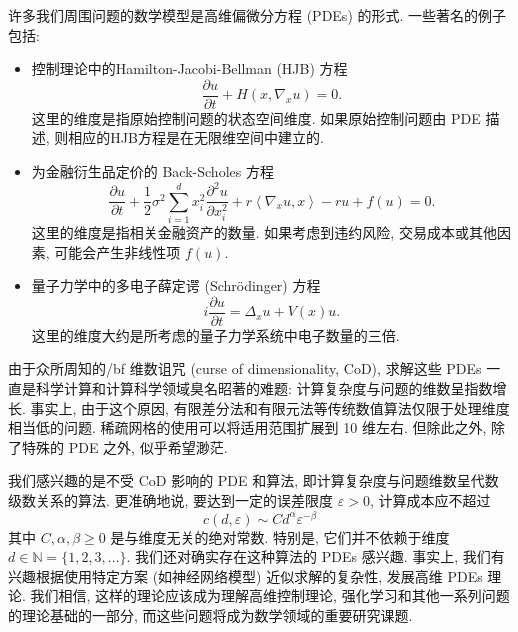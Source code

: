 \documentclass[12pt,AutoFakeBold,AutoFakeSlant]{article}
\newcommand{\bi}{\begin{itemize}}
\newcommand{\ei}{\end{itemize}}
\theoremstyle{definition}
\newcommand{\N}{\mathbb{N}}
\newcommand{\bx}{{x}}
\newcommand{\eps}{\varepsilon}
\begin{document}
	许多我们周围问题的数学模型是高维偏微分方程 (PDEs) 的形式. 一些著名的例子包括:
	\bi
		\item
			控制理论中的Hamilton-Jacobi-Bellman (HJB) 方程
			\begin{equation}
				\frac{ \partial u }{ \partial t } + H( \bx, \nabla_x u ) = 0 .
			\end{equation}
			这里的维度是指原始控制问题的状态空间维度. 如果原始控制问题由 PDE 描述, 则相应的HJB方程是在无限维空间中建立的.
		\item
			为金融衍生品定价的 Back-Scholes 方程
			\begin{equation}
				\frac{ \partial u }{ \partial t } + \frac12\sigma^2 \sum_{i=1}^d x_i^2\frac{\partial^2 u}{\partial x_i^2} + r \left< \nabla_x u , \bx \right> - r u + f(u) = 0 .
			\end{equation}
				这里的维度是指相关金融资产的数量. 如果考虑到违约风险, 交易成本或其他因素, 可能会产生非线性项 $f(u)$.
		\item
			量子力学中的多电子薛定谔 (Schr\"odinger) 方程
			\begin{equation}
				i \frac{ \partial u }{ \partial t } =   \Delta_x u + V(\bx) u .
			\end{equation}
			这里的维度大约是所考虑的量子力学系统中电子数量的三倍.
	\ei

	由于众所周知的{/bf 维数诅咒 (curse of dimensionality, CoD)}, 求解这些 PDEs 一直是科学计算和计算科学领域臭名昭著的难题: 计算复杂度与问题的维数呈指数增长. 事实上, 由于这个原因, 有限差分法和有限元法等传统数值算法仅限于处理维度相当低的问题. 稀疏网格的使用可以将适用范围扩展到 10 维左右. 但除此之外, 除了特殊的 PDE 之外, 似乎希望渺茫.

	我们感兴趣的是不受 CoD 影响的 PDE 和算法, 即计算复杂度与问题维数呈代数级数关系的算法. 更准确地说, 要达到一定的误差限度 $ \eps > 0 $, 计算成本应不超过
	\begin{equation}
		c(d, \eps) \sim C d^{\alpha} \eps^{-\beta}
		\label{cost}
	\end{equation}
	其中 $ C, \alpha, \beta \geq 0 $ 是与维度无关的绝对常数. 特别是, 它们并不依赖于维度 $ d \in \N = \{ 1, 2, 3, \dots \} $. 我们还对确实存在这种算法的 PDEs 感兴趣. 事实上, 我们有兴趣根据使用特定方案 (如神经网络模型) 近似求解的复杂性, 发展高维 PDEs 理论. 我们相信, 这样的理论应该成为理解高维控制理论, 强化学习和其他一系列问题的理论基础的一部分, 而这些问题将成为数学领域的重要研究课题.
	
\end{document}
